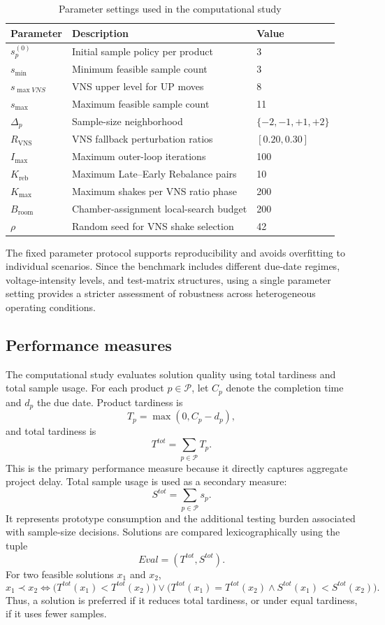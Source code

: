 \documentclass[11pt]{article}
\begin{document}
\begin{table}[H]
\centering
\caption{Parameter settings used in the computational study}
\label{tab:param_settings_final}

\begin{tabular}{lll}
\hline
\textbf{Parameter} & \textbf{Description} & \textbf{Value} \\
\hline
\(s_p^{(0)}\) & Initial sample policy per product & 3 \\
\(s_{\min}\) & Minimum feasible sample count & 3 \\
\(s_{\max VNS}\) & VNS upper level for UP moves & 8 \\
\(s_{\max}\) & Maximum feasible sample count & 11 \\
\(\Delta_p\) & Sample-size neighborhood & \(\{-2,-1,+1,+2\}\) \\
\(R_{\mathrm{VNS}}\) & VNS fallback perturbation ratios & \([0.20,0.30]\) \\
\(I_{\max}\) & Maximum outer-loop iterations & 100 \\
\(K_{\mathrm{reb}}\) & Maximum Late--Early Rebalance pairs & 10 \\
\(K_{\max}\) & Maximum shakes per VNS ratio phase & 200 \\
\(B_{\mathrm{room}}\) & Chamber-assignment local-search budget & 200 \\
\(\rho\) & Random seed for VNS shake selection & 42 \\
\hline
\end{tabular}
\end{table}

The fixed parameter protocol supports reproducibility and avoids overfitting to individual scenarios. Since the benchmark includes different due-date regimes, voltage-intensity levels, and test-matrix structures, using a single parameter setting provides a stricter assessment of robustness across heterogeneous operating conditions.
\subsection{Performance measures}
\label{subsec:metrics}

The computational study evaluates solution quality using total tardiness and total sample usage. For each product \(p\in\mathcal{P}\), let \(C_p\) denote the completion time and \(d_p\) the due date. Product tardiness is
\[
T_p=\max(0,C_p-d_p),
\]
and total tardiness is
\[
T^{tot}=\sum_{p\in\mathcal{P}}T_p.
\]
This is the primary performance measure because it directly captures aggregate project delay. Total sample usage is used as a secondary measure:
\[
S^{tot}=\sum_{p\in\mathcal{P}}s_p.
\]
It represents prototype consumption and the additional testing burden associated with sample-size decisions. Solutions are compared lexicographically using the tuple
\[
Eval=(T^{tot},S^{tot}).
\]
For two feasible solutions \(x_1\) and \(x_2\),
\[
x_1 \prec x_2
\iff
\big(T^{tot}(x_1)<T^{tot}(x_2)\big)
\lor
\big(T^{tot}(x_1)=T^{tot}(x_2)\land S^{tot}(x_1)<S^{tot}(x_2)\big).
\]
Thus, a solution is preferred if it reduces total tardiness, or under equal tardiness, if it uses fewer samples.
\end{document}
